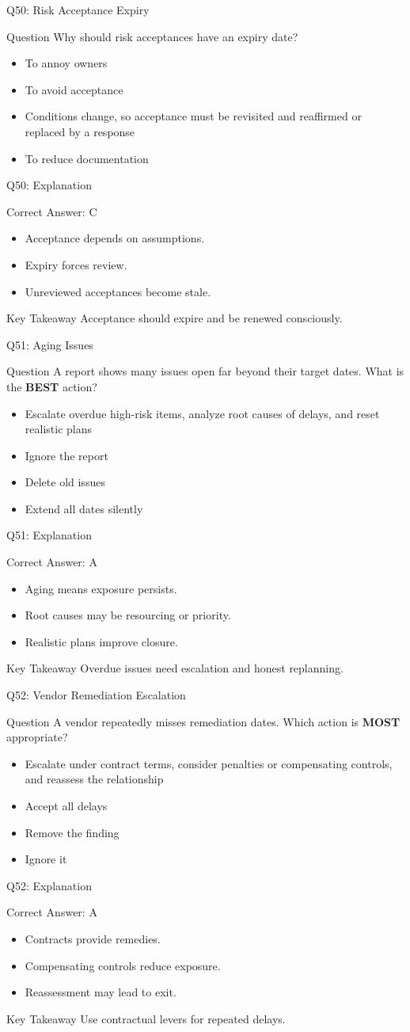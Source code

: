 \documentclass[aspectratio=169]{beamer}
\newcommand{\hq}[7]{%
	\begin{frame}{Q#1: #2}
		\begin{block}{Question}
			#3
		\end{block}
		\begin{itemize}
			#4
		\end{itemize}
	\end{frame}
	\begin{frame}{Q#1: Explanation}
		\begin{block}{Correct Answer: #5}
			\begin{itemize}
				#6
			\end{itemize}
		\end{block}
		\begin{alertblock}{Key Takeaway}
			#7
		\end{alertblock}
	\end{frame}
}
\begin{document}
	\hq{50}{Risk Acceptance Expiry}
	{Why should risk acceptances have an expiry date?}
	{\item[\textbf{(A)}] To annoy owners
		\item[\textbf{(B)}] To avoid acceptance
		\item[\textbf{(C)}] Conditions change, so acceptance must be revisited and reaffirmed or replaced by a response
		\item[\textbf{(D)}] To reduce documentation}
	{C}
	{\item Acceptance depends on assumptions.
		\item Expiry forces review.
		\item Unreviewed acceptances become stale.}
	{Acceptance should expire and be renewed consciously.}

	\hq{51}{Aging Issues}
	{A report shows many issues open far beyond their target dates. What is the \textbf{BEST} action?}
	{\item[\textbf{(A)}] Escalate overdue high-risk items, analyze root causes of delays, and reset realistic plans
		\item[\textbf{(B)}] Ignore the report
		\item[\textbf{(C)}] Delete old issues
		\item[\textbf{(D)}] Extend all dates silently}
	{A}
	{\item Aging means exposure persists.
		\item Root causes may be resourcing or priority.
		\item Realistic plans improve closure.}
	{Overdue issues need escalation and honest replanning.}

	\hq{52}{Vendor Remediation Escalation}
	{A vendor repeatedly misses remediation dates. Which action is \textbf{MOST} appropriate?}
	{\item[\textbf{(A)}] Escalate under contract terms, consider penalties or compensating controls, and reassess the relationship
		\item[\textbf{(B)}] Accept all delays
		\item[\textbf{(C)}] Remove the finding
		\item[\textbf{(D)}] Ignore it}
	{A}
	{\item Contracts provide remedies.
		\item Compensating controls reduce exposure.
		\item Reassessment may lead to exit.}
	{Use contractual levers for repeated delays.}
\end{document}
